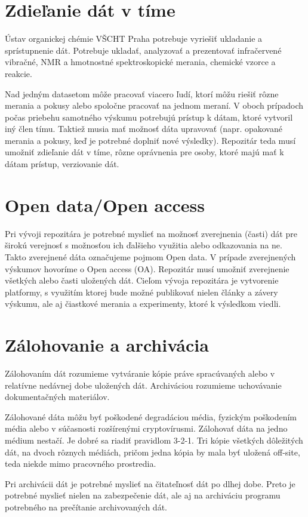 \documentclass[thesis=M,slovak]{FITthesis}[2013/05/06]
\begin{document}
\section{Zdieľanie dát v tíme}
Ústav organickej chémie VŠCHT Praha potrebuje vyriešiť ukladanie a sprístupnenie dát. Potrebuje ukladať, analyzovať a prezentovať infračervené vibračné, NMR a hmotnostné spektroskopické merania, chemické vzorce a reakcie.

Nad jedným datasetom môže pracovať viacero ľudí, ktorí môžu riešiť rôzne merania a pokusy alebo spoločne pracovať na jednom meraní. V oboch prípadoch počas priebehu samotného výskumu potrebujú prístup k dátam, ktoré vytvoril iný člen tímu. Taktiež musia mať možnosť dáta upravovať (napr. opakované merania a pokusy, keď je potrebné doplniť nové výsledky). Repozitár teda musí umožniť zdieľanie dát v tíme, rôzne oprávnenia pre osoby, ktoré majú mať k dátam prístup, verziovanie dát.

\section{Open data/Open access}
Pri vývoji repozitára je potrebné myslieť na možnosť zverejnenia (časti) dát pre širokú verejnosť s možnosťou ich ďalšieho využitia alebo odkazovania na ne. Takto zverejnené dáta označujeme pojmom Open data. V prípade zverejnených výskumov hovoríme o Open access (OA). Repozitár musí umožniť zverejnenie všetkých alebo časti uložených dát. Cieľom vývoja repozitára je vytvorenie platformy, s využitím ktorej bude možné publikovať nielen články a závery výskumu, ale aj čiastkové merania a experimenty, ktoré k výsledkom viedli.

\section{Zálohovanie a archivácia}
Zálohovaním dát rozumieme vytváranie kópie práve spracúvaných alebo v relatívne nedávnej dobe uložených dát. Archiváciou rozumieme uchovávanie dokumentačných materiálov.

Zálohované dáta môžu byť poškodené degradáciou média, fyzickým poškodením média alebo v súčasnosti rozšírenými cryptovírusmi. Zálohovať dáta na jedno médium nestačí. Je dobré sa riadiť pravidlom 3-2-1. Tri kópie všetkých dôležitých dát, na dvoch rôznych médiách, pričom jedna kópia by mala byť uložená off-site, teda niekde mimo pracovného prostredia. \cite{zalohovanie}

Pri archivácii dát je potrebné myslieť na čitateľnosť dát po dlhej dobe. Preto je potrebné myslieť nielen na zabezpečenie dát, ale aj na archiváciu programu potrebného na prečítanie archivovaných dát.
\end{document}
